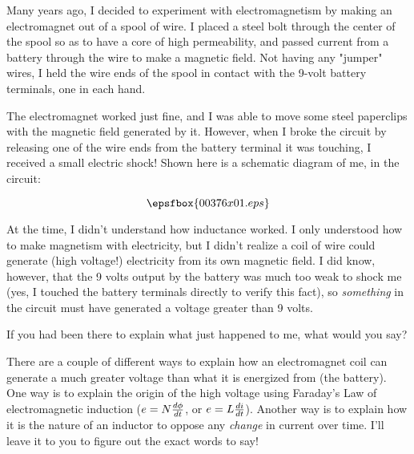 

Many years ago, I decided to experiment with electromagnetism by making an electromagnet out of a spool of wire.  I placed a steel bolt through the center of the spool so as to have a core of high permeability, and passed current from a battery through the wire to make a magnetic field.  Not having any "jumper" wires, I held the wire ends of the spool in contact with the 9-volt battery terminals, one in each hand.

The electromagnet worked just fine, and I was able to move some steel paperclips with the magnetic field generated by it.  However, when I broke the circuit by releasing one of the wire ends from the battery terminal it was touching, I received a small electric shock!  Shown here is a schematic diagram of me, in the circuit:

$$\epsfbox{00376x01.eps}$$

At the time, I didn't understand how inductance worked.  I only understood how to make magnetism with electricity, but I didn't realize a coil of wire could generate (high voltage!) electricity from its own magnetic field.  I did know, however, that the 9 volts output by the battery was much too weak to shock me (yes, I touched the battery terminals directly to verify this fact), so {\it something} in the circuit must have generated a voltage greater than 9 volts.

If you had been there to explain what just happened to me, what would you say?







There are a couple of different ways to explain how an electromagnet coil can generate a much greater voltage than what it is energized from (the battery).  One way is to explain the origin of the high voltage using Faraday's Law of electromagnetic induction ($e = N{d\phi \over dt}$, or $e = L{di \over dt}$).  Another way is to explain how it is the nature of an inductor to oppose any {\it change} in current over time.  I'll leave it to you to figure out the exact words to say!






